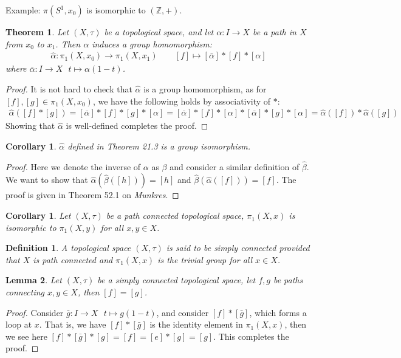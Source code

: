 \documentclass[11pt]{book}
\theoremstyle{break}
\theoremstyle{break}
\newtheorem{thm}{Theorem}[section]
\newtheorem{lem}{Lemma}[thm]
\newtheorem{corL}{Corollary}[lem]
\newtheorem{corT}[lem]{Corollary}
\newtheorem{defn}{Definition}[corL]
\newcommand{\Z}{\mathbb{Z}}
\newcommand{\example}{\color{green}Example: \color{black}}
\begin{document}
\example $\pi(S^1,x_0)$ is isomorphic to $(\Z,+)$.  \\

\begin{thm}
Let $(X,\tau)$ be a topological space, and let $\alpha:I \to X$ be a path in $X$ from $x_0$ to $x_1$. Then $\alpha$ induces a group homomorphism:
\begin{align*}
\hat{\alpha}: \pi_1(X,x_0) \to \pi_1(X,x_1) \qquad [f] \mapsto [\bar{\alpha}]*[f]*[\alpha]
\end{align*}
where $\bar{\alpha}: I \to X \ \ \ t\mapsto \alpha(1-t)$. 
\end{thm}
\begin{proof}
It is not hard to check that $\hat{\alpha}$ is a group homomorphism, as for $[f],[g] \in \pi_1(X,x_0)$, we have the following holds by associativity of $*$:
\begin{align*}
\hat{\alpha} \left( [f] *[g]\right)  = [\bar{\alpha}]*[f]*[g]*[\alpha] = [\bar{\alpha}]*[f]*[\alpha]*[\bar{\alpha}] * [g] * [\alpha] = \hat{\alpha}\left( [f]\right) * \hat{\alpha}\left([g]\right)
\end{align*}
Showing that $\hat{\alpha}$ is well-defined completes the proof. 
\end{proof}
\begin{corT}
$\hat{\alpha}$ defined in Theorem 21.3 is a group isomorphism. 
\end{corT}
\begin{proof}
Here we denote the inverse of $\alpha$ as $\beta$ and consider a similar definition of $\hat{\beta}$. We want to show that $\hat{\alpha}(\hat{\beta}([h])) = [h]$ and $\hat{\beta}(\hat{\alpha}([f])) = [f]$. The proof is given in Theorem 52.1 on \textit{Munkres}. 
\end{proof}

\begin{corL}
Let $(X,\tau)$ be a path connected topological space, $\pi_1(X,x)$ is isomorphic to $\pi_1(X,y)$ for all $x,y \in X$.  
\end{corL}

\begin{defn}
A topological space $(X,\tau)$ is said to be simply connected provided that $X$ is path connected and $\pi_1(X,x)$ is the trivial group for all $x \in X$. 
\end{defn}
\begin{lem}
Let $(X,\tau)$ be a simply connected topological space, let $f,g$ be paths connecting $x,y \in X$, then $[f] = [g]$.
\end{lem}
\begin{proof}
Consider $\bar{g}:I \to X \ \ \ t\mapsto g(1-t)$, and consider $[f]*[\bar{g}]$, which forms a loop at $x$. That is, we have $[f] * [\bar{g}]$ is the identity element in $\pi_1(X,x)$, then we see here $[f]*[\bar{g}]*[g] = [f] = [e]*[g] = [g]$. This completes the proof. 
\end{proof}
\end{document}
